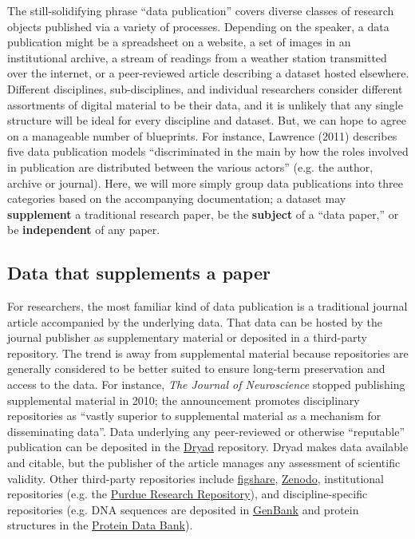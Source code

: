 \documentclass[10pt,twocolumn]{article}
\begin{document}
The still-solidifying phrase ``data publication'' covers diverse classes of research objects published via a variety of processes.
Depending on the speaker, a data publication might be a spreadsheet on a website, a set of images in an institutional archive, a stream of readings from a weather station transmitted over the internet, or a peer-reviewed article describing a dataset hosted elsewhere.
Different disciplines, sub-disciplines, and individual researchers consider different assortments of digital material to be their data, and it is unlikely that any single structure will be ideal for every discipline and dataset.
But, we can hope to agree on a manageable number of blueprints.
For instance, Lawrence (2011) describes five data publication models ``discriminated in the main by how the roles involved in publication are distributed between the various actors'' (e.g. the author, archive or journal).\cite{lawrence_data_2011}
Here, we will more simply group data publications into three categories based on the accompanying documentation; a dataset may \textbf{supplement} a traditional research paper, be the \textbf{subject} of a ``data paper,'' or be \textbf{independent} of any paper.

\subsection*{Data that supplements a paper}\label{paper-supplement-data}

For researchers, the most familiar kind of data publication is a traditional journal article accompanied by the underlying data.
That data can be hosted by the journal publisher as supplementary material or deposited in a third-party repository.
The trend is away from supplemental material because repositories are generally considered to be better suited to ensure long-term preservation and access to the data.
For instance, \emph{The Journal of Neuroscience} stopped publishing supplemental material in 2010; the announcement promotes disciplinary repositories as ``vastly superior to supplemental material as a mechanism for disseminating data''\cite{maunsell_announcement_2010}.
Data underlying any peer-reviewed or otherwise ``reputable'' publication can be deposited in the \href{http://datadryad.org/}{Dryad} repository.
Dryad makes data available and citable, but the publisher of the article manages any assessment of scientific validity.
Other third-party repositories include \href{http://figshare.com/}{figshare}, \href{http://zenodo.org/}{Zenodo}, institutional repositories (e.g. the \href{https://purr.purdue.edu/}{Purdue Research Repository}), and discipline-specific repositories (e.g. DNA sequences are deposited in \href{http://www.ncbi.nlm.nih.gov/genbank/}{GenBank}\cite{benson_genbank_2013} and protein structures in the \href{http://www.rcsb.org/}{Protein Data Bank}\cite{berman_protein_2000}).
\end{document}
